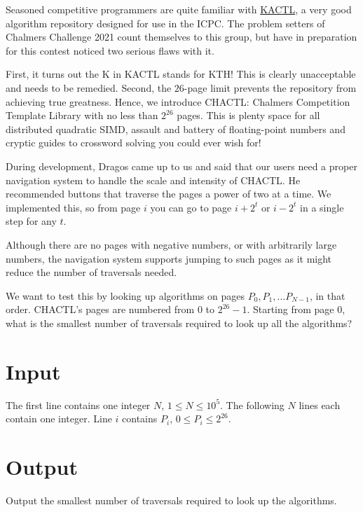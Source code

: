 Seasoned competitive programmers are quite familiar with \href{https://github.com/kth-competitive-programming/kactl}{\textsc{KACTL}}, a very good algorithm repository designed for use in the ICPC.
The problem setters of Chalmers Challenge 2021 count themselves to
this group, but have in preparation for this contest noticed two serious flaws with it.

First, it turns out the \textsc{K} in \textsc{KACTL} stands for \textsc{KTH}! This is clearly
unacceptable and needs to be remedied. Second, the $26$-page limit prevents the repository from
achieving true greatness. Hence, we introduce \textsc{CHACTL}: Chalmers Competition Template Library
with no less than $2^{26}$ pages. This is plenty space for all distributed quadratic SIMD, assault and
battery of floating-point numbers and cryptic guides to crossword solving you could ever wish for!

During development, Dragos came up to us and said that our users need a proper navigation system to
handle the scale and intensity of \textsc{CHACTL}. He recommended buttons that traverse the pages a
power of two at a time. We implemented this, so from page $i$ you can go to page $i + 2^t$ or $i -
2^t$ in a single step for any $t$.

Although there are no pages with negative numbers, or with arbitrarily large numbers, the navigation
system supports jumping to such pages as it might reduce the number of traversals needed.

We want to test this by looking up algorithms on pages $P_0, P_1, \ldots P_{N-1}$, in that order.
\textsc{CHACTL}'s pages are numbered from $0$ to $2^{26} - 1$. Starting from page $0$, what is the
smallest number of traversals required to look up all the algorithms?

\section*{Input}
The first line contains one integer $N$, $1 \le N \le 10^5$. The following $N$ lines each contain
one integer. Line $i$ contains $P_i$, $0 \le P_i \le 2^{26}$.

\section*{Output}
Output the smallest number of traversals required to look up the algorithms.
